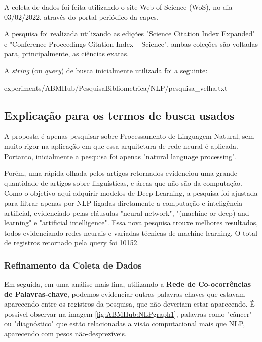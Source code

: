 A coleta de dados foi feita utilizando o site Web of Science (WoS), no dia 03/02/2022, através do portal periódico da capes.

A pesquisa foi realizada utilizando as edições "Science Citation Index Expanded" e "Conference Proceedings Citation Index – Science", ambas coleções são voltadas para, principalmente, as ciências exatas.

A \textit{string} (ou \textit{query}) de busca inicialmente utilizada foi a seguinte:


{experiments/ABMHub/PesquisaBibliometrica/NLP/pesquisa_velha.txt}

\subsection{Explicação para os termos de busca usados}
\label{sec:ABMHub:query}

A proposta é apenas pesquisar sobre Processamento de Linguagem Natural, sem muito rigor na aplicação em que essa arquitetura de rede neural é aplicada. Portanto, inicialmente a pesquisa foi apenas "natural language processing".

Porém, uma rápida olhada pelos artigos retornados evidenciou uma grande quantidade de artigos sobre linguísticas, e áreas que não são da computação. Como o objetivo aqui adquirir modelos de Deep Learning, a pesquisa foi ajustada para filtrar apenas por NLP ligadas diretamente a computação e inteligência artificial, evidenciado pelas cláusulas "neural network", "(machine or deep) and learning" e "artificial intelligence". Essa nova pesquisa trouxe melhores resultados, todos evidenciando redes neurais e variadas técnicas de machine learning. O total de registros retornado pela query foi 10152.

\subsubsection{Refinamento da Coleta de Dados}

 Em seguida, em uma análise mais fina, utilizando a \textbf{Rede de Co-ocorrências de Palavras-chave}, podemos evidenciar outras palavras chaves que estavam aparecendo entre os registros da pesquisa, que não deveriam estar aparecendo. É possível observar na imagem \ref{fig:ABMHub:NLPgraph1}, palavras como "câncer" ou "diagnóstico" que estão relacionadas a visão computacional mais que NLP, aparecendo com pesos não-desprezíveis.
 
